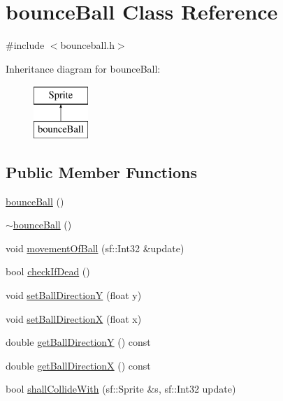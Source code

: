 \hypertarget{classbounce_ball}{\section{bounce\-Ball Class Reference}
\label{classbounce_ball}
}


{\ttfamily \#include $<$bounceball.\-h$>$}

Inheritance diagram for bounce\-Ball\-:\begin{figure}[H]
\begin{center}
\leavevmode
\includegraphics[height=2.000000cm]{classbounce_ball}
\end{center}
\end{figure}
\subsection*{Public Member Functions}
\begin{DoxyCompactItemize}
\item 
\hyperlink{classbounce_ball_ab9cd9e9e07b75288688ddf48e8805808}{bounce\-Ball} ()
\item 
\hyperlink{classbounce_ball_a5aade551a140ca729b82db53a71923ea}{$\sim$bounce\-Ball} ()
\item 
void \hyperlink{classbounce_ball_a05e818abbd26e5f24f08604557b99be2}{movement\-Of\-Ball} (sf\-::\-Int32 \&update)
\item 
bool \hyperlink{classbounce_ball_aef61d98587fe7ac412dee9578dbad59d}{check\-If\-Dead} ()
\item 
void \hyperlink{classbounce_ball_ae23ce7e3294786a71ab6975162d3e08a}{set\-Ball\-Direction\-Y} (float y)
\item 
void \hyperlink{classbounce_ball_a81160a8f16a17df7906fbf624f62f857}{set\-Ball\-Direction\-X} (float x)
\item 
double \hyperlink{classbounce_ball_ac7d3e884d8b6d1f0f902dcf5be3a3890}{get\-Ball\-Direction\-Y} () const 
\item 
double \hyperlink{classbounce_ball_a5868831d08186838d6e21a35c8f733ad}{get\-Ball\-Direction\-X} () const 
\item 
bool \hyperlink{classbounce_ball_a3eb081b76ad67cc68759d3149e334b54}{shall\-Collide\-With} (sf\-::\-Sprite \&s, sf\-::\-Int32 update)
\end{DoxyCompactItemize}


